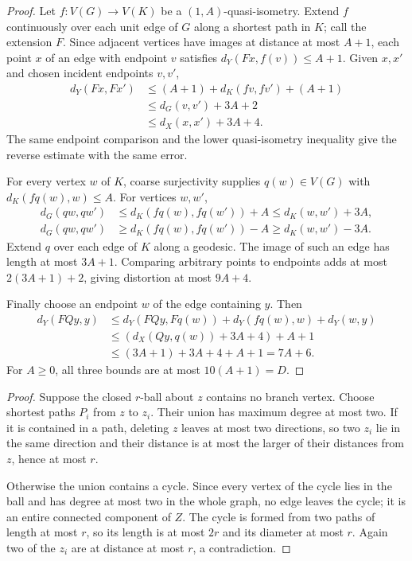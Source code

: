 \documentclass[11pt,a4paper]{article}
\theoremstyle{plain}
\theoremstyle{definition}
\theoremstyle{remark}
\begin{document}
\label{pf:coarse}
\lemcoarse*
\begin{proof}
Let $f\colon V(G)\to V(K)$ be a $(1,A)$-quasi-isometry. Extend $f$ continuously over each unit edge of $G$ along a shortest path in $K$; call the extension $F$. Since adjacent vertices have images at distance at most $A+1$, each point $x$ of an edge with endpoint $v$ satisfies $d_Y(Fx,f(v))\le A+1$. Given $x,x'$ and chosen incident endpoints $v,v'$,
\[
\begin{aligned}
d_Y(Fx,Fx')&\le(A+1)+d_K(fv,fv')+(A+1)\\
&\le d_G(v,v')+3A+2\\
&\le d_X(x,x')+3A+4.
\end{aligned}
\]
The same endpoint comparison and the lower quasi-isometry inequality give the reverse estimate with the same error.

For every vertex $w$ of $K$, coarse surjectivity supplies $q(w)\in V(G)$ with $d_K(fq(w),w)\le A$. For vertices $w,w'$,
\[
\begin{aligned}
d_G(qw,qw')&\le d_K(fq(w),fq(w'))+A\le d_K(w,w')+3A,\\
d_G(qw,qw')&\ge d_K(fq(w),fq(w'))-A\ge d_K(w,w')-3A.
\end{aligned}
\]
Extend $q$ over each edge of $K$ along a geodesic. The image of such an edge has length at most $3A+1$. Comparing arbitrary points to endpoints adds at most $2(3A+1)+2$, giving distortion at most $9A+4$.

Finally choose an endpoint $w$ of the edge containing $y$. Then
\[
\begin{aligned}
d_Y(FQy,y)
&\le d_Y(FQy,Fq(w))+d_Y(fq(w),w)+d_Y(w,y)\\
&\le (d_X(Qy,q(w))+3A+4)+A+1\\
&\le (3A+1)+3A+4+A+1=7A+6.
\end{aligned}
\]
For $A\ge0$, all three bounds are at most $10(A+1)=D$.
\end{proof}

\label{pf:branch}
\lembranch*
\begin{proof}
Suppose the closed $r$-ball about $z$ contains no branch vertex. Choose shortest paths $P_i$ from $z$ to $z_i$. Their union has maximum degree at most two. If it is contained in a path, deleting $z$ leaves at most two directions, so two $z_i$ lie in the same direction and their distance is at most the larger of their distances from $z$, hence at most $r$.

Otherwise the union contains a cycle. Since every vertex of the cycle lies in the ball and has degree at most two in the whole graph, no edge leaves the cycle; it is an entire connected component of $Z$. The cycle is formed from two paths of length at most $r$, so its length is at most $2r$ and its diameter at most $r$. Again two of the $z_i$ are at distance at most $r$, a contradiction.
\end{proof}
\end{document}
